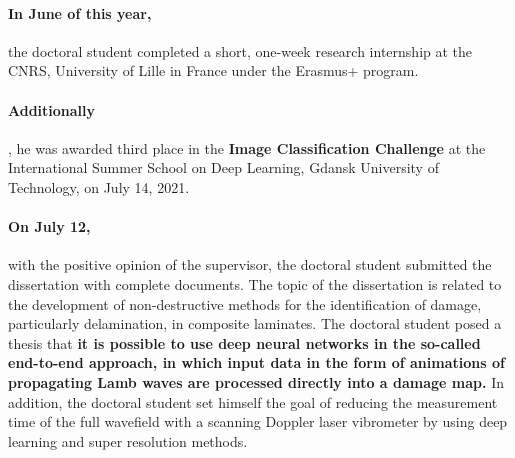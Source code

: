\documentclass[12pt,a4paper]{article}
\begin{document}
	\paragraph{In June of this year,}the doctoral student completed a short, one-week research internship at the CNRS, University of Lille in France under the Erasmus+ program.
	\noindent
	\paragraph{Additionally}, he was awarded third place in the \textbf{Image Classification Challenge} at the International Summer School on Deep Learning, Gdansk University of Technology, on July 14, 2021.

	\noindent	
	\paragraph{On July 12,}with the positive opinion of the supervisor, the doctoral student submitted the dissertation with complete documents. 
	The topic of the dissertation is related to the development of non-destructive methods for the identification of damage, particularly delamination, in composite laminates. 
	The doctoral student posed a thesis that \textbf{it is possible to use deep neural networks in the so-called end-to-end approach, in which input data in the form of animations of propagating Lamb waves are processed directly into a damage map.}
	In addition, the doctoral student set himself the goal of reducing the measurement time of the full wavefield with a scanning Doppler laser vibrometer by using deep learning and super resolution methods.	
\end{document}
